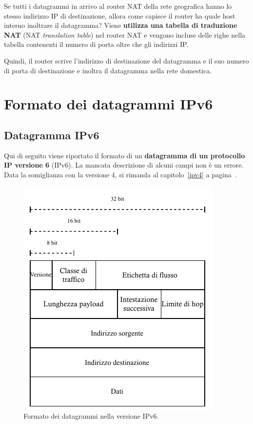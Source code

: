 \documentclass[a4paper]{article}
\begin{document}
	\noindent
	Se tutti i datagrammi in arrivo al router \textsf{NAT} della rete geografica hanno lo stesso indirizzo IP di destinazione, allora come capisce il router ha quale host interno inoltrare il datagramma? Viene \textbf{utilizza una tabella di traduzione \textsf{NAT}} (\textsf{NAT} \emph{translation table}) nel router \textsf{NAT} e vengono incluse delle righe nella tabella contenenti il numero di porta oltre che gli indirizzi IP.\newline
	
	\noindent
	Quindi, il router scrive l’indirizzo di destinazione del datagramma e il suo numero di porta di destinazione e inoltra il datagramma nella rete domestica.\newpage
	
	\section{Formato dei datagrammi IPv6}
	
	\subsection{Datagramma IPv6}
	
	Qui di seguito viene riportato il formato di un \textcolor{Red3}{\textbf{datagramma di un protocollo IP versione 6}} (IPv6). La mancata descrizione di alcuni campi non è un errore. Data la somiglianza con la versione 4, si rimanda al capitolo~\ref{ipv4} a pagina~\pageref{ipv4}.
	\begin{figure}[!htp]
		\centering
		\includegraphics[width=.85\textwidth]{img/datagrammi_ipv6.pdf}
		\caption{Formato dei datagrammi nella versione IPv6.}
	\end{figure}
\end{document}
